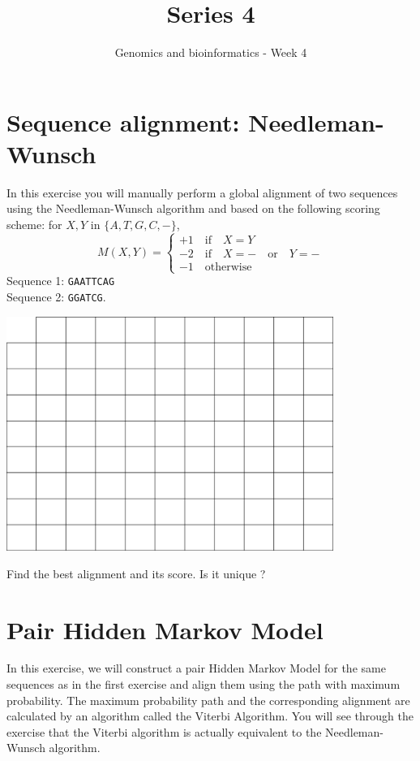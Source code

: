 \documentclass[a4paper,11pt]{article}
\title{Series 4}
\date{}
\author{Genomics and bioinformatics - Week 4}
\begin{document}
\maketitle


\section{Sequence alignment: Needleman-Wunsch}
In this exercise you will manually perform a global alignment of two sequences using the
Needleman-Wunsch algorithm and based on the following scoring scheme: for $X,Y$ in $\{A,T,G,C,-\}$, 
$$
M(X,Y) = \left\{ 
\begin{array}{l}
	+1 \quad\text{if}\quad X = Y \\
	-2 \quad\text{if}\quad X = - \quad\text{or}\quad Y = - \\
	-1 \quad \text{otherwise}
\end{array} \right.
$$
Sequence 1: \texttt{GAATTCAG}\\
Sequence 2: \texttt{GGATCG}.
\vspace{0.5cm}
\begin{center}
\includegraphics[width=0.8\textwidth]{matrix.png}
\end{center}
\vspace{0.5cm}

\noindent Find the best alignment and its score. Is it unique ?

\newpage 

\section{Pair Hidden Markov Model}

In this exercise, we will construct a pair Hidden Markov Model for
the same sequences as in the first exercise and align them using the
path with maximum probability. The maximum probability path and the 
corresponding alignment are calculated by an algorithm called the Viterbi Algorithm. 
You will see through the exercise that the Viterbi algorithm is actually equivalent
to the Needleman-Wunsch algorithm.
\end{document}

